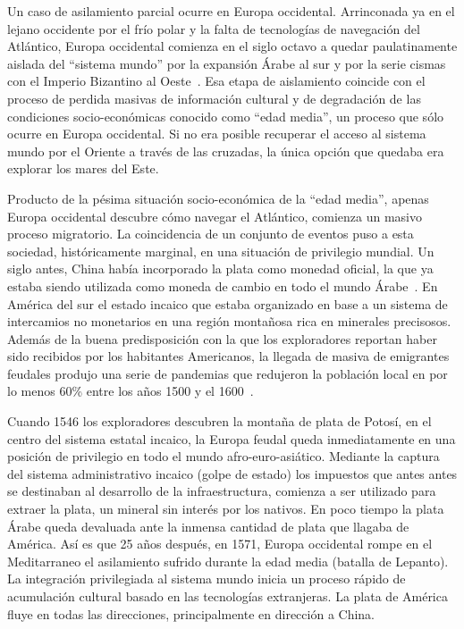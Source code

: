 \documentclass[a4paper,10pt]{book}
\begin{document}
Un caso de asilamiento parcial ocurre en Europa occidental.
Arrinconada ya en el lejano occidente por el fr\'io polar y la falta de tecnolog\'ias de navegaci\'on del Atlántico, Europa occidental comienza en el siglo octavo a quedar paulatinamente aislada del ``sistema mundo'' por la expansión Árabe al sur y por la serie cismas con el Imperio Bizantino al Oeste~\cite{Dussel}.
Esa etapa de aislamiento coincide con el proceso de perdida masivas de información cultural y de degradación de las condiciones socio-económicas conocido como ``edad media'', un proceso que sólo ocurre en Europa occidental.
Si no era posible recuperar el acceso al sistema mundo por el Oriente a través de las cruzadas, la única opci\'on que quedaba era explorar los mares del Este.


Producto de la pésima situación socio-económica de la ``edad media'', apenas Europa occidental descubre cómo navegar el Atlántico, comienza un masivo proceso migratorio.
La coincidencia de un conjunto de eventos puso a esta sociedad, históricamente marginal, en una situación de privilegio mundial.
Un siglo antes, China hab\'ia incorporado la plata como monedad oficial, la que ya estaba siendo utilizada como moneda de cambio en todo el mundo Árabe~\cite{pomeranz2000-divergence, pomeranz2018-tradeCreated}.
En América del sur el estado incaico que estaba organizado en base a un sistema de intercamios no monetarios en una región montañosa rica en minerales precisosos.
Además de la buena predisposición con la que los exploradores reportan haber sido recibidos por los habitantes Americanos, la llegada de masiva de emigrantes feudales produjo una serie de pandemias que redujeron la población local en por lo menos 60\% entre los años 1500 y el 1600~\cite{koch2019-europeanArrival}.


Cuando 1546 los exploradores descubren la montaña de plata de Potosí, en el centro del sistema estatal incaico, la Europa feudal queda inmediatamente en una posición de privilegio en todo el mundo afro-euro-asiático.
Mediante la captura del sistema administrativo incaico (golpe de estado) los impuestos que antes antes se destinaban al desarrollo de la infraestructura, comienza a ser utilizado para extraer la plata, un mineral sin interés por los nativos.
En poco tiempo la plata Árabe queda devaluada ante la inmensa cantidad de plata que llagaba de América.
Así es que 25 años después, en 1571, Europa occidental rompe en el Meditarraneo el asilamiento sufrido durante la edad media (batalla de Lepanto).
La integración privilegiada al sistema mundo inicia un proceso rápido de acumulación cultural basado en las tecnologías extranjeras.
La plata de América fluye en todas las direcciones, principalmente en dirección a China.
\end{document}
